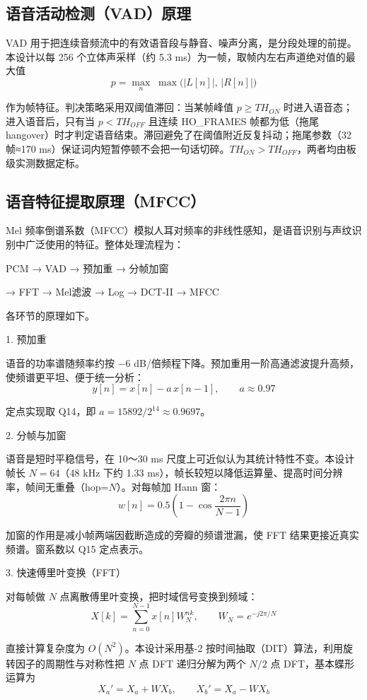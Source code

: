 \documentclass[UTF8,zihao=-4,fontset=windows]{ctexart}
\newcommand{\code}[1]{{\ttfamily #1}}
\newcommand{\subhead}[1]{%
  \par\medskip
  {\heiti\zihao{-4}#1}
  \nopagebreak
  \par\smallskip
}
\begin{document}
\subsection{语音活动检测（VAD）原理}

VAD 用于把连续音频流中的有效语音段与静音、噪声分离，是分段处理的前提。本设计以每 256 个立体声采样（约 5.3 ms）为一帧，取帧内左右声道绝对值的最大值
\[
p=\max_n\;\max\!\big(|L[n]|,\,|R[n]|\big)
\]

作为帧特征。判决策略采用双阈值滞回：当某帧峰值 $p\ge TH_{ON}$ 时进入语音态；进入语音后，只有当 $p<TH_{OFF}$ 且连续 \code{HO\_FRAMES} 帧都为低（拖尾 hangover）时才判定语音结束。滞回避免了在阈值附近反复抖动；拖尾参数（32 帧≈170 ms）保证词内短暂停顿不会把一句话切碎。$TH_{ON}>TH_{OFF}$，两者均由板级实测数据定标。

\subsection{语音特征提取原理（MFCC）}

Mel 频率倒谱系数（MFCC）模拟人耳对频率的非线性感知，是语音识别与声纹识别中广泛使用的特征。整体处理流程为：
\begin{center}
PCM → VAD → 预加重 → 分帧加窗 

→ FFT → Mel滤波 → Log → DCT-II → MFCC
\end{center}

各环节的原理如下。

\subhead{1. 预加重}

语音的功率谱随频率约按 $-6$ dB/倍频程下降。预加重用一阶高通滤波提升高频，使频谱更平坦、便于统一分析：
\[
y[n]=x[n]-a\,x[n-1],\qquad a\approx 0.97
\]

定点实现取 Q14，即 $a=15892/2^{14}\approx 0.9697$。

\subhead{2. 分帧与加窗}

语音是短时平稳信号，在 10～30 ms 尺度上可近似认为其统计特性不变。本设计帧长 $N=64$（48 kHz 下约 1.33 ms），帧长较短以降低运算量、提高时间分辨率，帧间无重叠（\code{hop}=$N$）。对每帧加 Hann 窗：
\[
w[n]=0.5\left(1-\cos\frac{2\pi n}{N-1}\right)
\]

加窗的作用是减小帧两端因截断造成的旁瓣的频谱泄漏，使 FFT 结果更接近真实频谱。窗系数以 Q15 定点表示。

\subhead{3. 快速傅里叶变换（FFT）}

对每帧做 $N$ 点离散傅里叶变换，把时域信号变换到频域：
\[
X[k]=\sum_{n=0}^{N-1}x[n]W_N^{nk},\qquad W_N=e^{-j2\pi/N}
\]

直接计算复杂度为 $O(N^2)$。本设计采用基-2 按时间抽取（DIT）算法，利用旋转因子的周期性与对称性把 $N$ 点 DFT 递归分解为两个 $N/2$ 点 DFT，基本蝶形运算为
\[
X_a' = X_a + W X_b,\qquad X_b' = X_a - W X_b
\]
\end{document}
